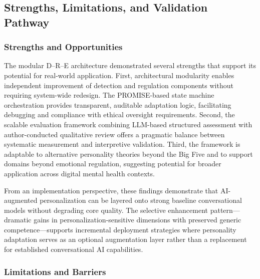 \documentclass[apajournal,article,submit,moreauthors]{Definitions/mdpi}
\begin{document}
\subsection{Strengths, Limitations, and Validation Pathway}\label{strengths-limitations-and-validation-pathway}

\subsubsection{Strengths and Opportunities}\label{strengths-and-opportunities}

The modular D--R--E architecture demonstrated several strengths that support its potential for real-world application. First, architectural modularity enables independent improvement of detection and regulation components without requiring system-wide redesign. The PROMISE-based state machine orchestration provides transparent, auditable adaptation logic, facilitating debugging and compliance with ethical oversight requirements. Second, the scalable evaluation framework combining LLM-based structured assessment with author-conducted qualitative review offers a pragmatic balance between systematic measurement and interpretive validation. Third, the framework is adaptable to alternative personality theories beyond the Big Five and to support domains beyond emotional regulation, suggesting potential for broader application across digital mental health contexts.

From an implementation perspective, these findings demonstrate that AI-augmented personalization can be layered onto strong baseline conversational models without degrading core quality. The selective enhancement pattern---dramatic gains in personalization-sensitive dimensions with preserved generic competence---supports incremental deployment strategies where personality adaptation serves as an optional augmentation layer rather than a replacement for established conversational AI capabilities.

\subsubsection{Limitations and Barriers}\label{limitations-and-barriers}
\end{document}
